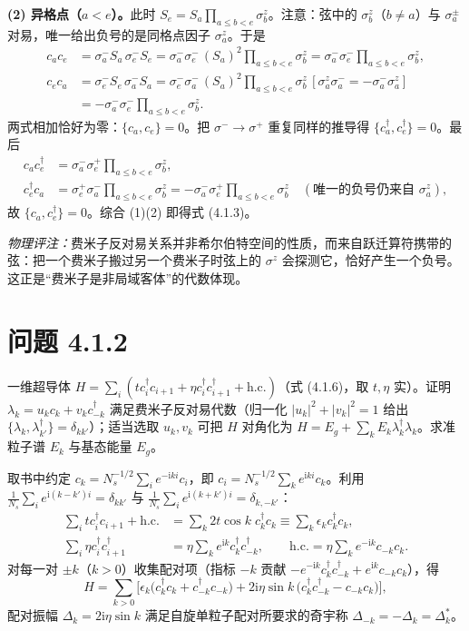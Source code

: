 \textbf{(2) 异格点（$a<e$）。}此时 $S_e=S_a\prod_{a\le b<e}\sigma^z_b$。注意：弦中的 $\sigma^z_b$（$b\ne a$）与 $\sigma^{\pm}_a$ 对易，唯一给出负号的是同格点因子 $\sigma^z_a$。于是
\begin{align*}
c_ac_e&=\sigma^-_aS_a\,\sigma^-_eS_e
=\sigma^-_a\sigma^-_e\,(S_a)^2\prod_{a\le b<e}\sigma^z_b
=\sigma^-_a\sigma^-_e\prod_{a\le b<e}\sigma^z_b,\\
c_ec_a&=\sigma^-_eS_e\,\sigma^-_aS_a
=\sigma^-_e\sigma^-_a\,(S_a)^2\prod_{a\le b<e}\sigma^z_b\,[\sigma^z_a\sigma^-_a=-\sigma^-_a\sigma^z_a]\\
&=-\sigma^-_a\sigma^-_e\prod_{a\le b<e}\sigma^z_b .
\end{align*}
两式相加恰好为零：$\{c_a,c_e\}=0$。把 $\sigma^-\to\sigma^+$ 重复同样的推导得 $\{c^\dagger_a,c^\dagger_e\}=0$。最后
\begin{align*}
c_ac_e^\dagger&=\sigma^-_a\sigma^+_e\prod_{a\le b<e}\sigma^z_b,\\
c_e^\dagger c_a&=\sigma^+_e\sigma^-_a\prod_{a\le b<e}\sigma^z_b
=-\sigma^-_a\sigma^+_e\prod_{a\le b<e}\sigma^z_b
\quad(\text{唯一的负号仍来自 }\sigma^z_a),
\end{align*}
故 $\{c_a,c_e^\dagger\}=0$。综合 (1)(2) 即得式 (4.1.3)。

\emph{物理评注：}费米子反对易关系并非希尔伯特空间的性质，而来自跃迁算符携带的弦：把一个费米子搬过另一个费米子时弦上的 $\sigma^z$ 会探测它，恰好产生一个负号。这正是“费米子是非局域客体”的代数体现。

\section*{问题 4.1.2}
\begin{problem}
一维超导体 $H=\sum_i(tc^\dagger_ic_{i+1}+\eta c^\dagger_ic^\dagger_{i+1}+\text{h.c.})$（式 (4.1.6)，取 $t,\eta$ 实）。证明 $\lambda_k=u_kc_k+v_kc^\dagger_{-k}$ 满足费米子反对易代数（归一化 $|u_k|^2+|v_k|^2=1$ 给出 $\{\lambda_k,\lambda^\dagger_{k'}\}=\delta_{kk'}$）；适当选取 $u_k,v_k$ 可把 $H$ 对角化为 $H=E_g+\sum_kE_k\lambda^\dagger_k\lambda_k$。求准粒子谱 $E_k$ 与基态能量 $E_g$。
\end{problem}
\solution
取书中约定 $c_k=N_s^{-1/2}\sum_ie^{-\mathrm{i}k i}c_i$，即 $c_i=N_s^{-1/2}\sum_ke^{\mathrm{i}k i}c_k$。利用 $\frac{1}{N_s}\sum_ie^{\mathrm{i}(k-k')i}=\delta_{kk'}$ 与 $\frac{1}{N_s}\sum_ie^{\mathrm{i}(k+k')i}=\delta_{k,-k'}$：
\begin{align*}
\sum_itc^\dagger_ic_{i+1}+\text{h.c.}&=\sum_k2t\cos k\;c^\dagger_kc_k\equiv\sum_k\epsilon_kc^\dagger_kc_k,\\
\sum_i\eta c^\dagger_ic^\dagger_{i+1}&=\eta\sum_ke^{\mathrm{i}k}c^\dagger_kc^\dagger_{-k},\qquad
\text{h.c.}=\eta\sum_ke^{-\mathrm{i}k}c_{-k}c_k .
\end{align*}
对每一对 $\pm k$（$k>0$）收集配对项（指标 $-k$ 贡献 $-e^{-\mathrm{i}k}c^\dagger_kc^\dagger_{-k}+e^{\mathrm{i}k}c_{-k}c_k$），得
\begin{equation*}
H=\sum_{k>0}\Big[\epsilon_k\big(c^\dagger_kc_k+c^\dagger_{-k}c_{-k}\big)
+2\mathrm{i}\eta\sin k\,\big(c^\dagger_kc^\dagger_{-k}-c_{-k}c_k\big)\Big],
\end{equation*}
配对振幅 $\Delta_k=2\mathrm{i}\eta\sin k$ 满足自旋单粒子配对所要求的奇宇称 $\Delta_{-k}=-\Delta_k=\Delta_k^*$。

